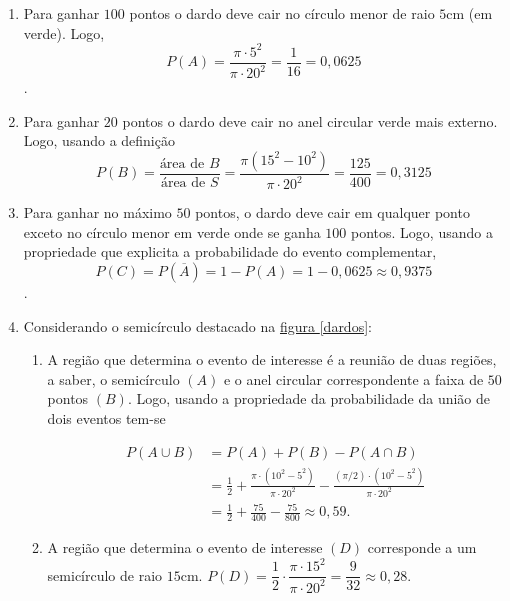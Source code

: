 \documentclass[10 pt,usenames,dvipsnames, oneside]{article}
\begin{document}
\ifdefined\prof
\begin{solucao}

\begin{enumerate}
\item Para ganhar $100$ pontos o dardo deve cair no círculo menor de raio $5$cm (em verde). Logo, 
$$P(A)=\dfrac{\pi\cdot5^2}{\pi\cdot20^2}=\dfrac{1}{16}=0{,}0625$$.
\item Para ganhar $20$ pontos o dardo deve cair no anel circular verde mais externo. Logo, usando a definição 
\begin{equation*}
P(B)=\frac{\text{área de $B$}}{\text{área de $S$}}=\frac{\pi(15^2-10^2)}{\pi\cdot20^2}=\frac{125}{400}=0{,}3125
\end{equation*}
\item Para ganhar no máximo $50$ pontos, o dardo deve cair em qualquer ponto exceto no círculo menor em verde onde se ganha $100$ pontos. Logo, usando a propriedade que explicita a probabilidade do evento complementar, \begin{equation*}
P(C)=P(\overline{A})=1-P(A)=1-0{,}0625\approx0{,}9375
\end{equation*}.
\item Considerando o semicírculo destacado na \hyperref[dardos]{figura \ref{dardos}}:\begin{enumerate}
\item A região que determina o evento de interesse é a reunião de duas regiões, a saber, o semicírculo $(A)$ e o anel circular correspondente a faixa de $50$ pontos $(B)$. Logo, usando a propriedade da probabilidade da união de dois eventos tem-se 

\begin{align*}
P(A\cup B)&=P(A)+P(B)-P(A\cap B)\\
&=\frac{1}{2}+\frac{\pi\cdot(10^2-5^2)}{\pi\cdot20^2}-\frac{(\pi/2)\cdot(10^2-5^2)}{\pi\cdot20^2}\\
&=\frac{1}{2}+\frac{75}{400}-\frac{75}{800}\approx0{,}59.
\end{align*}

\item A região que determina o evento de interesse $(D)$ corresponde a um semicírculo de raio $15$cm. $P(D)=\dfrac{1}{2}\cdot\dfrac{\pi\cdot15^2}{\pi\cdot20^2}=\dfrac{9}{32}\approx0{,}28$.
\end{enumerate}
\end{enumerate}

\end{solucao}
\fi
\end{document}
